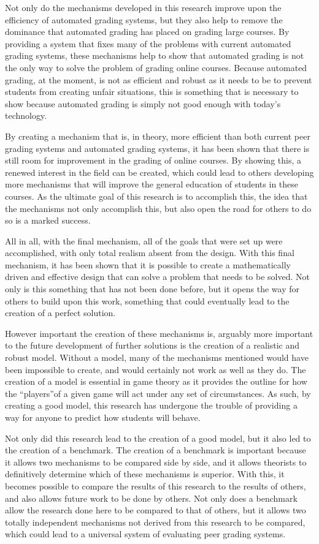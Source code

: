 \documentclass[12pt, Arial]{article}
\begin{document}
Not only do the mechanisms developed in this research improve upon the efficiency of automated grading systems, but they also help to remove the dominance that automated grading has placed on grading large courses. By providing a system that fixes many of the problems with current automated grading systems, these mechanisms help to show that automated grading is not the only way to solve the problem of grading online courses. Because automated grading, at the moment, is not as efficient and robust as it needs to be to prevent students from creating unfair situations, this is something that is necessary to show because automated grading is simply not good enough with today's technology.

By creating a mechanism that is, in theory, more efficient than both current peer grading systems and automated grading systems, it has been shown that there is still room for improvement in the grading of online courses. By showing this, a renewed interest in the field can be created, which could lead to others developing more mechanisms that will improve the general education of students in these courses. As the ultimate goal of this research is to accomplish this, the idea that the mechanisms not only accomplish this, but also open the road for others to do so is a marked success.

All in all, with the final mechanism, all of the goals that were set up were accomplished, with only total realism absent from the design. With this final mechanism, it has been shown that it is possible to create a mathematically driven and effective design that can solve a problem that needs to be solved. Not only is this something that has not been done before, but it opens the way for others to build upon this work, something that could eventually lead to the creation of a perfect solution. 

However important the creation of these mechanisms is, arguably more important to the future development of further solutions is the creation of a realistic and robust model. Without a model, many of the mechanisms mentioned would have been impossible to create, and would certainly not work as well as they do. The creation of a model is essential in game theory as it provides the outline for how the ``players''of a given game will act under any set of circumstances. As such, by creating a good model, this research has undergone the trouble of providing a way for anyone to predict how students will behave. 

Not only did this research lead to the creation of a good model, but it also led to the creation of a benchmark. The creation of a benchmark is important because it allows two mechanisms to be compared side by side, and it allows theorists to definitively determine which of these mechanisms is superior. With this, it becomes possible to compare the results of this research to the results of others, and also allows future work to be done by others. Not only does a benchmark allow the research done here to be compared to that of others, but it allows two totally independent mechanisms not derived from this research to be compared, which could lead to a universal system of evaluating peer grading systems.
\end{document}
